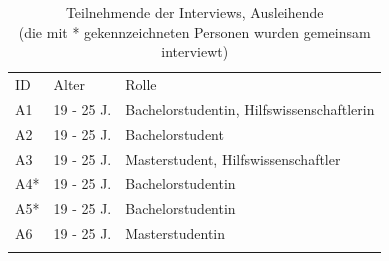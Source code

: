 \begin{table}[h]
        \centering
        \caption{Teilnehmende der Interviews, Ausleihende \\
                (die mit * gekennzeichneten Personen wurden gemeinsam interviewt)}
        \begin{tabular}{lll}
                \arrayrulecolor{maincolor}\hline
                \sffamily\color{maincolor}ID & \sffamily\color{maincolor}Alter &
                \sffamily\color{maincolor}Rolle                                                     \\
                \arrayrulecolor{maincolor}\hline
                A1                           & 19 - 25 J.                      & Bachelorstudentin,
                Hilfswissenschaftlerin                                                              \\
                A2                           & 19 - 25 J.                      & Bachelorstudent
                \\
                A3                           & 19 - 25 J.                      & Masterstudent,
                Hilfswissenschaftler                                                                \\
                A4*                          & 19 - 25 J.                      & Bachelorstudentin
                \\
                A5*                          & 19 - 25 J.                      & Bachelorstudentin
                \\
                A6                           & 19 - 25 J.                      & Masterstudentin
                \\
                \arrayrulecolor{maincolor}\hline
        \end{tabular}
        \label{table:a}
\end{table}


